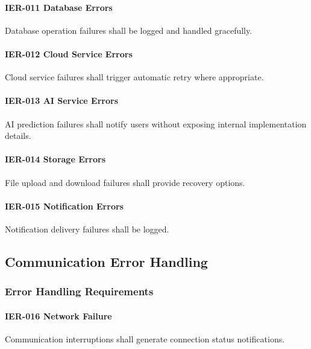 \paragraph{IER-011 Database Errors}

Database operation failures shall be logged and handled gracefully.

\paragraph{IER-012 Cloud Service Errors}

Cloud service failures shall trigger automatic retry where appropriate.

\paragraph{IER-013 AI Service Errors}

AI prediction failures shall notify users without exposing internal
implementation details.

\paragraph{IER-014 Storage Errors}

File upload and download failures shall provide recovery options.

\paragraph{IER-015 Notification Errors}

Notification delivery failures shall be logged.


\subsection{Communication Error Handling}

\subsubsection*{Error Handling Requirements}

\paragraph{IER-016 Network Failure}

Communication interruptions shall generate connection status
notifications.

